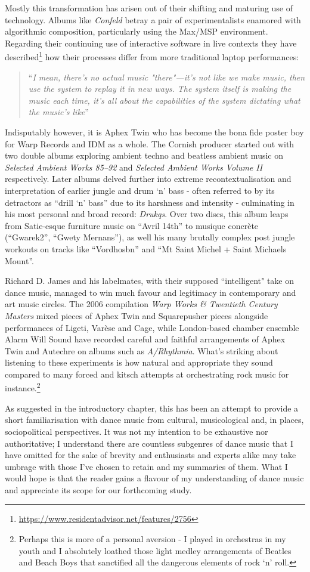 Mostly this transformation has arisen out of their shifting and maturing use of technology. Albums like \textit{Confeld} betray a pair of experimentalists enamored with algorithmic composition, particularly using the Max/MSP environment. Regarding their continuing use of interactive software in live contexts they have described\footnote{\url{https://www.residentadvisor.net/features/2756}} how their processes differ from more traditional laptop performances: 

\blockquote{``\textit{I mean, there's no actual music "there"—it's not like we make music, then use the system to replay it in new ways. The system itself is making the music each time, it's all about the capabilities of the system dictating what the music's like}''}

Indisputably however, it is Aphex Twin who has become the bona fide poster boy for Warp Records and IDM as a whole. The Cornish producer started out with two double albums exploring ambient techno and beatless ambient music on \textit{Selected Ambient Works 85–92} and \textit{Selected Ambient Works Volume II} respectively. Later albums delved further into extreme recontextualisation and interpretation of earlier jungle and drum ‘n’ bass - often referred to by its detractors as “drill ‘n’ bass” due to its harshness and intensity - culminating in his most personal and broad record: \textit{Drukqs}. Over two discs, this album leaps from Satie-esque furniture music on “Avril 14th” to musique concrète (``Gwarek2'', ``Gwety Mernans''), as well his many brutally complex post jungle workouts on tracks like “Vordhosbn” and “Mt Saint Michel + Saint Michaels Mount”. 

Richard D. James and his labelmates, with their supposed ``intelligent" take on dance music, managed to win much favour and legitimacy in contemporary and art music circles. The 2006 compilation \textit{Warp Works \& Twentieth Century Masters }mixed pieces of Aphex Twin and Squarepusher pieces alongside performances of Ligeti, Varèse and Cage, while London-based chamber ensemble Alarm Will Sound have recorded careful and faithful arrangements of Aphex Twin and Autechre on albums such as  \textit{A/Rhythmia}. What’s striking about listening to these experiments is how natural and appropriate they sound compared to many forced and kitsch attempts at orchestrating rock music for instance.\footnote{Perhaps this is more of a personal aversion - I played in orchestras in my youth and I absolutely loathed those light medley arrangements of Beatles and Beach Boys that sanctified all the dangerous elements of rock `n' roll.}

As suggested in the introductory chapter, this has been an attempt to provide a short familiarisation with dance music from cultural, musicological and, in places, sociopolitical perspectives. It was not my intention to be exhaustive nor authoritative; I understand there are countless subgenres of dance music that I have omitted for the sake of brevity and enthusiasts and experts alike may take umbrage with those I've chosen to retain and my summaries of them. What I would hope is that the reader gains a flavour of my understanding of dance music and appreciate its scope for our forthcoming study.